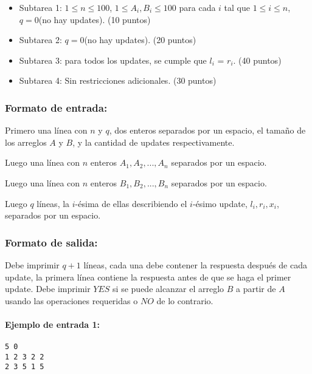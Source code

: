 \begin{itemize}
\item
  Subtarea 1: \(1 \leq n \leq 100\), \(1 \leq A_i, B_i \leq 100\) para
  cada \(i\) tal que \(1 \leq i \leq n\), \(q = 0\)(no hay updates). (10
  puntos)
\item
  Subtarea 2: \(q = 0\)(no hay updates). (20 puntos)
\item
  Subtarea 3: para todos los updates, se cumple que \(l_i\) = \(r_i\).
  (40 puntos)
\item
  Subtarea 4: Sin restricciones adicionales. (30 puntos)
\end{itemize}

\hypertarget{formato-de-entrada}{%
\subsubsection{Formato de entrada:}\label{formato-de-entrada}}

Primero una línea con \(n\) y \(q\), dos enteros separados por un
espacio, el tamaño de los arreglos \(A\) y \(B\), y la cantidad de
updates respectivamente.

Luego una línea con \(n\) enteros \(A_1, A_2, ... , A_n\) separados por
un espacio.

Luego una línea con \(n\) enteros \(B_1, B_2, ... , B_n\) separados por
un espacio.

Luego \(q\) líneas, la \(i\)-ésima de ellas describiendo el \(i\)-ésimo
update, \(l_i, r_i, x_i\), separados por un espacio.

\hypertarget{formato-de-salida}{%
\subsubsection{Formato de salida:}\label{formato-de-salida}}

Debe imprimir \(q+1\) líneas, cada una debe contener la respuesta
después de cada update, la primera línea contiene la respuesta antes de
que se haga el primer update. Debe imprimir \(YES\) si se puede alcanzar
el arreglo \(B\) a partir de \(A\) usando las operaciones requeridas o
\(NO\) de lo contrario.

\hypertarget{ejemplo-de-entrada-1}{%
\paragraph{Ejemplo de entrada 1:}\label{ejemplo-de-entrada-1}}

\begin{verbatim}
5 0
1 2 3 2 2
2 3 5 1 5
\end{verbatim}

